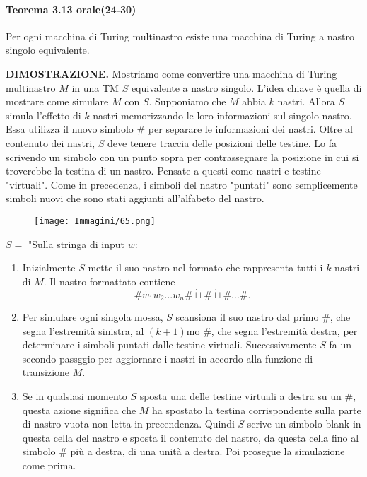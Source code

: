 \documentclass{article}
\begin{document}
\paragraph{Teorema 3.13 orale(24-30)}
\label{teorema-3.13}
\text{ }

\begin{tcolorbox}[colback=blue!10!white, colframe=blue!50!black, title=Teorema 3.13 (orale 24-30)]
    Per ogni macchina di Turing multinastro esiste una macchina di Turing a nastro singolo equivalente.
\end{tcolorbox}

\textbf{DIMOSTRAZIONE.}
Mostriamo come convertire una macchina di Turing multinastro $M$ in una TM $S$ equivalente a nastro singolo.
L'idea chiave è quella di mostrare come simulare $M$ con $S$.
Supponiamo che $M$ abbia $k$ nastri.
Allora $S$ simula l'effetto di $k$ nastri memorizzando le loro informazioni sul singolo nastro.
Essa utilizza il nuovo simbolo $\#$ per separare le informazioni dei nastri.
Oltre al contenuto dei nastri, $S$ deve tenere traccia delle posizioni delle testine.
Lo fa scrivendo un simbolo con un punto sopra per contrassegnare la posizione in cui si troverebbe la testina di un nastro.
Pensate a questi come nastri e testine "virtuali".
Come in precedenza, i simboli del nastro "puntati" sono semplicemente simboli nuovi che sono stati aggiunti all'alfabeto del nastro.

\begin{figure}[H]
    \centering
    \texttt{[image: Immagini/65.png]}
    \label{fig:turing_machine_example2}
\end{figure}

$S = $ "Sulla stringa di input $w$:
\begin{enumerate}
    \item Inizialmente $S$ mette il suo nastro nel formato che rappresenta tutti i $k$ nastri di $M$. Il nastro formattato contiene $$\#\dot{w_{1}}w_2...w_n\#\dot{\sqcup}\#\dot{\sqcup}\#...\#.$$
    \item Per simulare ogni singola mossa, $S$ scansiona il suo nastro dal primo $\#$, che segna l'estremità sinistra, al $(k+1)$mo $\#$, che segna l'estremità destra, per determinare i simboli puntati dalle testine virtuali. Successivamente $S$ fa un secondo passggio per aggiornare i nastri in accordo alla funzione di transizione $M$.
    \item Se in qualsiasi momento $S$ sposta una delle testine virtuali a destra su un $\#$, questa azione significa che $M$ ha spostato la testina corrispondente sulla parte di nastro vuota non letta in precendenza. Quindi $S$ scrive un simbolo blank in questa cella del nastro e sposta il contenuto del nastro, da questa cella fino al simbolo $\#$ più a destra, di una unità a destra. Poi prosegue la simulazione come prima.
\end{enumerate}
\end{document}
